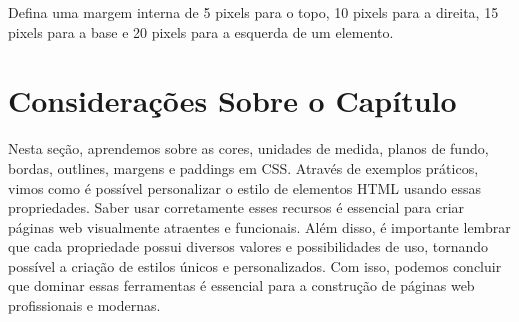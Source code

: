 \begin{exercise}
Defina uma margem interna de 5 pixels para o topo, 10 pixels para a direita, 15 pixels para a base e 20 pixels para a esquerda de um elemento.
\end{exercise}

\section{Considerações Sobre o Capítulo}

Nesta seção, aprendemos sobre as cores, unidades de medida, planos de fundo, bordas, outlines, margens e paddings em CSS. Através de exemplos práticos, vimos como é possível personalizar o estilo de elementos HTML usando essas propriedades. Saber usar corretamente esses recursos é essencial para criar páginas web visualmente atraentes e funcionais. Além disso, é importante lembrar que cada propriedade possui diversos valores e possibilidades de uso, tornando possível a criação de estilos únicos e personalizados. Com isso, podemos concluir que dominar essas ferramentas é essencial para a construção de páginas web profissionais e modernas.